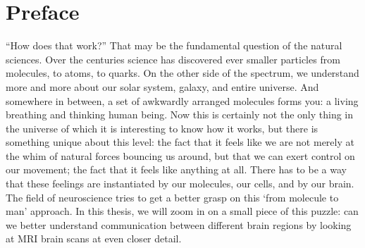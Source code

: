\section*{Preface}
``How does that work?'' That may be the fundamental question of the natural sciences. 
Over the centuries science has discovered ever smaller particles from molecules, to atoms, to quarks. On the other side of the spectrum, we understand more and more about our solar system, galaxy, and entire universe. And somewhere in between, a set of awkwardly arranged molecules forms you: a living breathing and thinking human being.
Now this is certainly not the only thing in the universe of which it is interesting to know how it works, but there is something unique about this level: the fact that it feels like we are not merely at the whim of natural forces bouncing us around, but that we can exert control on our movement; the fact that it feels like anything at all. There has to be a way that these feelings are instantiated by our molecules, our cells, and by our brain.
The field of neuroscience tries to get a better grasp on this `from molecule to man' approach. In this thesis, we will zoom in on a small piece of this puzzle: can we better understand communication between different brain regions by looking at MRI brain scans at even closer detail.
